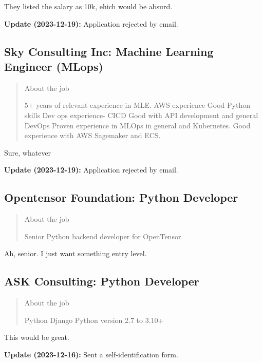 \documentclass[
	letterpaper, %
	12pt, %
]{CSSullivanBusinessReport}
\begin{document}
They listed the salary as 10k, ehich would be absurd. 

\textbf{Update (2023-12-19):} Application rejected by email.


\subsection[Sky Consulting Inc]{Sky Consulting Inc: Machine Learning Engineer (MLops)}

\begin{quote}
	About the job
	
	5+ years of relevant experience in MLE.
    AWS experience
    Good Python skills
    Dev ops experience- CICD
    Good with API development and general DevOps
    Proven experience in MLOps in general and Kubernetes.
    Good experience with AWS Sagemaker and ECS.

\end{quote}

Sure, whatever

\textbf{Update (2023-12-19):} Application rejected by email.


\subsection[Opentensor Foundation]{Opentensor Foundation: Python Developer}

\begin{quote}
	About the job
	
	Senior Python backend developer for OpenTensor.

\end{quote}

Ah, senior. I just want something entry level. 


\subsection[ASK Consulting]{ASK Consulting: Python Developer}

\begin{quote}
	About the job
	
	Python
    Django
    Python version 2.7 to 3.10+

\end{quote}

This would be great.

\textbf{Update (2023-12-16):} Sent a self-identification form.
\end{document}
